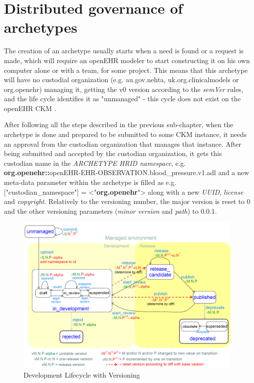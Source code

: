 \documentclass[mim_thesis.tex]{subfiles}
\begin{document}
\section{Distributed governance of archetypes}

The creation of an archetype usually starts when a need is found or a request is made, which will require an openEHR modeler to start constructing it on his own computer alone or with a team, for some project. This means that this archetype will have no custodial organization (e.g. au.gov.nehta, uk.org.clinicalmodels or org.openehr) managing it, getting the v0 version according to the \textit{semVer} rules, and the life cycle identifies it as "unmanaged" - this cycle does not exist on the openEHR CKM \citep{openehrckmgover2018}. 

After following all the steps described in the previous sub-chapter, when the archetype is done and prepared to be submitted to some CKM instance, it needs an approval from the custodian organization that manages that instance. After being submitted and accepted by the custodian organization, it gets this custodian name in the \textit{ARCHETYPE HRID namespace}, e.g. \textbf{org.openehr::}openEHR-EHR-OBSERVATION.blood\_pressure.v1.adl and a new meta-data parameter within the archetype is filled as  e.g. ["custodian\_namespace"] = <"\textbf{org.openehr}"> along with a new \textit{UUID}, \textit{license} and \textit{copyright}. Relatively to the versioning number, the major version is reset to 0 and the other versioning parameters (\textit{minor version} and \textit{path}) to 0.0.1. 

\begin{figure}[H]
	\centering
    \includegraphics[width=1\textwidth]{img/development_lifecycle_with_versioning.png}
	\caption{Development Lifecycle with Versioning \citep{openehrckmgover22018}}
	\label{fig:development_lifecycle_with_versioning}
\end{figure}
\end{document}

